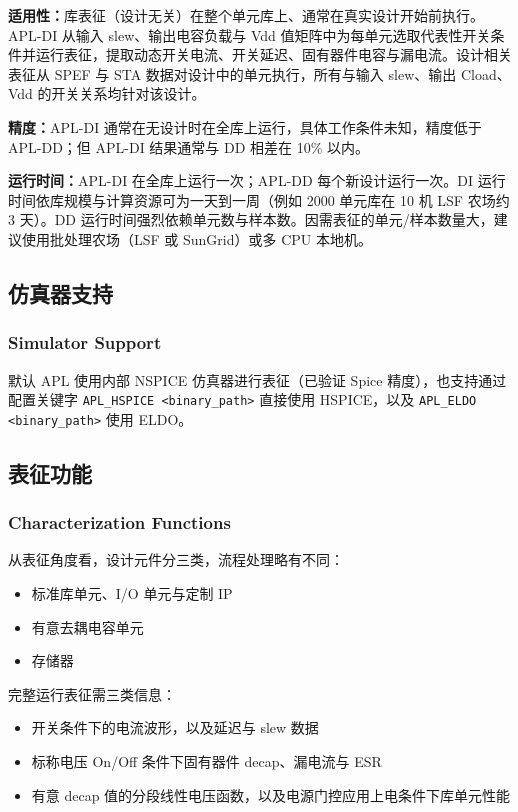 \textbf{适用性：}库表征（设计无关）在整个单元库上、通常在真实设计开始前执行。APL-DI 从输入 slew、输出电容负载与 Vdd 值矩阵中为每单元选取代表性开关条件并运行表征，提取动态开关电流、开关延迟、固有器件电容与漏电流。设计相关表征从 SPEF 与 STA 数据对设计中的单元执行，所有与输入 slew、输出 Cload、Vdd 的开关关系均针对该设计。

\textbf{精度：}APL-DI 通常在无设计时在全库上运行，具体工作条件未知，精度低于 APL-DD；但 APL-DI 结果通常与 DD 相差在 10\% 以内。

\textbf{运行时间：}APL-DI 在全库上运行一次；APL-DD 每个新设计运行一次。DI 运行时间依库规模与计算资源可为一天到一周（例如 2000 单元库在 10 机 LSF 农场约 3 天）。DD 运行时间强烈依赖单元数与样本数。因需表征的单元/样本数量大，建议使用批处理农场（LSF 或 SunGrid）或多 CPU 本地机。

\subsection{仿真器支持}
\subsubsection*{Simulator Support}

默认 APL 使用内部 NSPICE 仿真器进行表征（已验证 Spice 精度），也支持通过配置关键字 \texttt{APL\_HSPICE <binary\_path>} 直接使用 HSPICE，以及 \texttt{APL\_ELDO <binary\_path>} 使用 ELDO。

\subsection{表征功能}
\subsubsection*{Characterization Functions}

从表征角度看，设计元件分三类，流程处理略有不同：
\begin{itemize}
  \item 标准库单元、I/O 单元与定制 IP
  \item 有意去耦电容单元
  \item 存储器
\end{itemize}

完整运行表征需三类信息：
\begin{itemize}
  \item 开关条件下的电流波形，以及延迟与 slew 数据
  \item 标称电压 On/Off 条件下固有器件 decap、漏电流与 ESR
  \item 有意 decap 值的分段线性电压函数，以及电源门控应用上电条件下库单元性能
\end{itemize}

